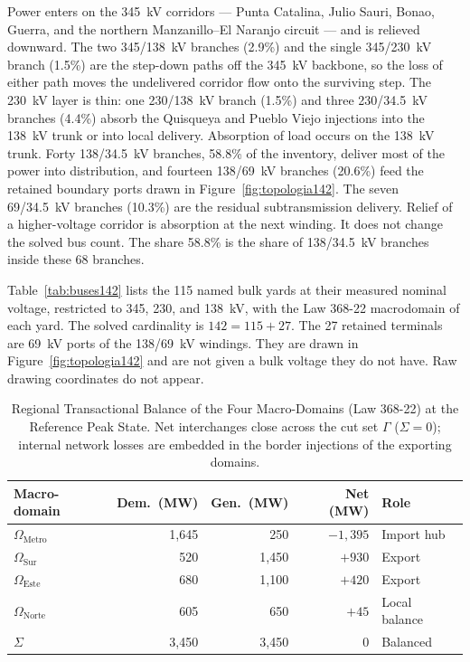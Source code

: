 Power enters on the 345~kV corridors --- Punta Catalina, Julio Sauri, Bonao, Guerra, and the northern Manzanillo--El Naranjo circuit --- and is relieved downward. The two 345/138~kV branches (2.9\%) and the single 345/230~kV branch (1.5\%) are the step-down paths off the 345~kV backbone, so the loss of either path moves the undelivered corridor flow onto the surviving step. The 230~kV layer is thin: one 230/138~kV branch (1.5\%) and three 230/34.5~kV branches (4.4\%) absorb the Quisqueya and Pueblo Viejo injections into the 138~kV trunk or into local delivery. Absorption of load occurs on the 138~kV trunk. Forty 138/34.5~kV branches, 58.8\% of the inventory, deliver most of the power into distribution, and fourteen 138/69~kV branches (20.6\%) feed the retained boundary ports drawn in Figure~\ref{fig:topologia142}. The seven 69/34.5~kV branches (10.3\%) are the residual subtransmission delivery. Relief of a higher-voltage corridor is absorption at the next winding. It does not change the solved bus count. The share 58.8\% is the share of 138/34.5~kV branches inside these 68 branches.

Table~\ref{tab:buses142} lists the 115 named bulk yards at their measured nominal voltage, restricted to 345, 230, and 138~kV, with the Law 368-22 macrodomain of each yard. The solved cardinality is $142=115+27$. The 27 retained terminals are 69~kV ports of the 138/69~kV windings. They are drawn in Figure~\ref{fig:topologia142} and are not given a bulk voltage they do not have. Raw drawing coordinates do not appear.

\begin{table}[!t]
\centering
\caption{Regional Transactional Balance of the Four Macro-Domains (Law 368-22) at the Reference Peak State. Net interchanges close across the cut set $\Gamma$ ($\Sigma = 0$); internal network losses are embedded in the border injections of the exporting domains.}
\label{tab:regbalance}
\footnotesize
\setlength{\tabcolsep}{3pt}
\begin{tabular}{@{}lrrrl@{}}
\toprule
\textbf{Macro-domain} & \textbf{Dem.\ (MW)} & \textbf{Gen.\ (MW)} & \textbf{Net (MW)} & \textbf{Role} \\
\midrule
$\Omega_{\mathrm{Metro}}$ & 1,645 & 250 & $-1{,}395$ & Import hub \\
$\Omega_{\mathrm{Sur}}$ & 520 & 1,450 & $+930$ & Export \\
$\Omega_{\mathrm{Este}}$ & 680 & 1,100 & $+420$ & Export \\
$\Omega_{\mathrm{Norte}}$ & 605 & 650 & $+45$ & Local balance \\
\midrule
$\Sigma$ & 3,450 & 3,450 & $0$ & Balanced \\
\bottomrule
\end{tabular}
\end{table}

